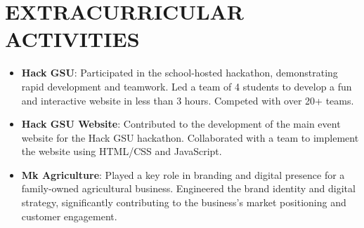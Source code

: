 \documentclass[letterpaper,11pt]{article}
\newcommand{\resumeItem}[1]{
  \item\small{
    {#1 \vspace{-1pt}}
  }
}
\newcommand{\resumeItemListStart}{\begin{itemize}[leftmargin=0.1in]}
\newcommand{\resumeItemListEnd}{\end{itemize}\vspace{-5pt}}
\begin{document}
\section{\color{airforceblue}EXTRACURRICULAR ACTIVITIES}
    \resumeItemListStart
        \resumeItem{\textbf{Hack GSU}: Participated in the school-hosted hackathon, demonstrating rapid development and teamwork. Led a team of 4 students to develop a fun and interactive website in less than 3 hours. Competed with over 20+ teams.}
        \resumeItem{\textbf{Hack GSU Website}: Contributed to the development of the main event website for the Hack GSU hackathon. Collaborated with a team to implement the website using HTML/CSS and JavaScript.}
        \resumeItem{\textbf{Mk Agriculture}: Played a key role in branding and digital presence for a family-owned agricultural business. Engineered the brand identity and digital strategy, significantly contributing to the business’s market positioning and customer engagement.}
    \resumeItemListEnd  
\end{document}
